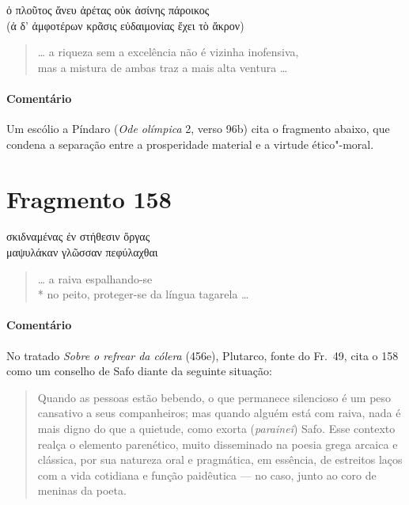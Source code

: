 {\begin{gkverse}
ὀ πλοῦτος ἄνευ ἀρέτας οὐκ ἀσίνης πάροικος\\
(ἀ δ’ ἀμφοτέρων κρᾶσις \dagger{}εὐδαιμονίας ἔχει τὸ ἄκρον\dagger{})
\end{gkverse}

\begin{verse}
\ldots{} a riqueza sem a excelência não é vizinha inofensiva,\\
mas a mistura de ambas traz a mais alta ventura \ldots{}
\end{verse}

{\paragraph{Comentário} Um escólio a Píndaro (\textit{Ode olímpica} 2, verso 96b) cita o fragmento abaixo,
que condena a separação entre a prosperidade material e a virtude ético"-moral.}

\pagebreak
\section{Fragmento 158}

\begin{gkverse}
σκιδναμένας ἐν στήθεσιν ὄργας\\
μαψυλάκαν γλῶσσαν πεφύλαχθαι
\end{gkverse}

\begin{verse}
\ldots{} a raiva espalhando-se \\*
no peito, proteger-se da língua tagarela \ldots{}
\end{verse}

{\paragraph{Comentário} No tratado \textit{Sobre o refrear da cólera} (456e), Plutarco, fonte do Fr.~49, cita o 158 como um conselho de Safo diante da seguinte situação:

\begin{quote}
Quando as pessoas estão bebendo, o que permanece silencioso é um peso
cansativo a seus companheiros; mas quando alguém está com raiva, nada é mais
digno do que a quietude, como exorta (\textit{paraineî}) Safo. Esse contexto realça o elemento parenético, muito disseminado na poesia grega arcaica e clássica, por sua natureza oral e pragmática, em essência, de estreitos laços com a vida cotidiana e função paidêutica --- no caso, junto ao coro de meninas da poeta.
\end{quote}}


}
